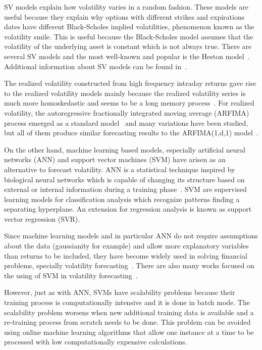 SV models explain how volatility varies in a random fashion. These models are
useful because they explain why options with different strikes and expirations
dates have different Black-Scholes implied volatilities, phenomenon known as
the volatility smile. This is useful because the Black-Scholes model assumes
that the volatility of the underlying asset is constant which is not always
true. There are several SV models and the most well-known and popular is the
Heston model~\cite{heston1993}. Additional information about SV models can be
found in~\cite{shephard1995}. 

The realized volatility constructed from high frequency intraday returns gave
rise to the realized volatility models mainly because the realized volatility
series is much more homoskedastic and seems to be a long memory
process~\cite{andersonetal2003}. For realized volatility, the autoregressive
fractionally integrated moving average (ARFIMA) process emerged as a standard
model~\cite{chenetal2010} and many variations have been studied, but all of
them produce similar forecasting results to the ARFIMA(1,d,1)
model~\cite{koopmanetal2005}.  

On the other hand, machine learning based models, especially artificial neural
networks (ANN) and support vector machines (SVM) have arisen as an alternative
to forecast volatility. ANN is a statistical technique inspired by biological
neural networks which is capable of changing its structure based on external or
internal information during a training phase~\cite{sammut2011}. SVM are
supervised learning models for classification analysis which recognize patterns
finding a separating hyperplane. An extension for regression analysis is known
as support vector regression (SVR). 

Since machine learning models and in particular ANN do not require assumptions
about the data (gaussianity for example) and allow more explanatory variables
than returns to be included, they have become widely used in solving financial
problems, specially volatility
forecasting~\cite{hamidetal2004,donaldsonetal1997}. There are also many works
focused on the using of SVM in volatility
forecasting~\cite{shiyietal2008,shiyietal2010,gavrishchaka2006,vasilios2012}. 

However, just as with ANN, SVMs have scalability problems because their
training process is computationally intensive and it is done in batch mode. The
scalability problem worsens when new additional training data is available and
a re-training process from scratch needs to be done. This problem can be
avoided using online machine learning algorithms that allow one instance at a
time to be processed with low computationally expensive calculations.



